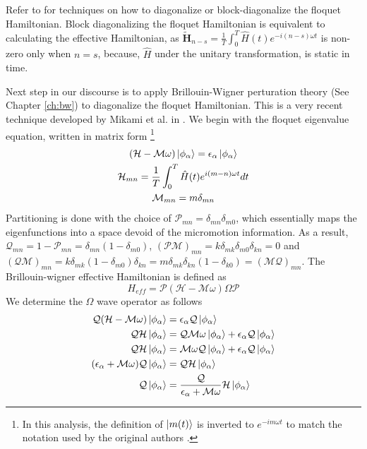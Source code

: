 Refer to \parencite{anisimovas2015high} for techniques on how to diagonalize or block-diagonalize the floquet Hamiltonian. Block diagonalizing the floquet Hamiltonian is
equivalent to calculating the effective Hamiltonian, as $\tilde{\mathbf{H}}_{n-s} = \frac{1}{T}\int_{0}^{T}{\hat{H}(t) e^{-i(n-s)\omega t}}$ is non-zero only when
$n=s$, because, $\hat{H}$ under the unitary transformation, is static in time.

Next step in our discourse is to apply Brillouin-Wigner perturation theory (See Chapter \ref{ch:bw}) to diagonalize the floquet Hamiltonian. This is a very recent technique developed by Mikami et al. in 
\parencite{mikami2016brillouin}. We begin with the floquet eigenvalue equation, written in matrix form \footnote{In this analysis, the definition of $\ket{m(t)}$ is 
inverted to $e^{-im\omega t}$ to match the notation used by the original authors \cite{mikami2016brillouin}.}
\begin{gather}
(\mathcal{H} - \mathcal{M}\omega)\ket{\phi_\alpha} = \epsilon_\alpha\ket{\phi_\alpha} \\
\mathcal{H}_{mn} = \frac{1}{T}\int_{0}^{T}{\hat{H}(t)e^{i(m-n)\omega t}dt} \\
\mathcal{M}_{mn} = m\delta_{mn}
\end{gather}
Partitioning is done with the choice of $\mathcal{P}_{mn} = \delta_{mn}\delta_{m0}$, which essentially maps the eigenfunctions into a space devoid of the micromotion information.
As a result, $\mathcal{Q}_{mn} = 1 - \mathcal{P}_{mn} = \delta_{mn}(1-\delta_{m0})$, $(\mathcal{P}\mathcal{M})_{mn} = k\delta_{mk}\delta_{m0}\delta_{kn}=0$ and
$(\mathcal{Q}\mathcal{M})_{mn} = k\delta_{mk}(1-\delta_{m0})\delta_{kn} = m\delta_{mk}\delta_{kn}(1-\delta_{k0}) = (\mathcal{M}\mathcal{Q})_{mn}$.
The Brillouin-wigner effective Hamiltonian is defined as
\begin{equation}
 H_{eff} = \mathcal{P}(\mathcal{H} - \mathcal{M}\omega)\Omega\mathcal{P}
\end{equation} We determine the $\Omega$ wave operator as follows
\begin{align}
 \mathcal{Q}(\mathcal{H} - \mathcal{M}\omega)\ket{\phi_\alpha} &= \epsilon_\alpha\mathcal{Q}\ket{\phi_\alpha} \nonumber \\
 \mathcal{Q}\mathcal{H}\ket{\phi_\alpha} &= \mathcal{Q}\mathcal{M}\omega\ket{\phi_\alpha} + \epsilon_\alpha\mathcal{Q}\ket{\phi_\alpha} \nonumber \\
 \mathcal{Q}\mathcal{H}\ket{\phi_\alpha} &= \mathcal{M}\omega\mathcal{Q}\ket{\phi_\alpha} + \epsilon_\alpha\mathcal{Q}\ket{\phi_\alpha} \nonumber \\
 (\epsilon_\alpha + \mathcal{M}\omega)\mathcal{Q}\ket{\phi_\alpha} &= \mathcal{Q}\mathcal{H}\ket{\phi_\alpha} \nonumber \\
 \mathcal{Q}\ket{\phi_\alpha} &= \frac{\mathcal{Q}}{\epsilon_\alpha + \mathcal{M}\omega}\mathcal{H}\ket{\phi_\alpha} \\
\end{align}
